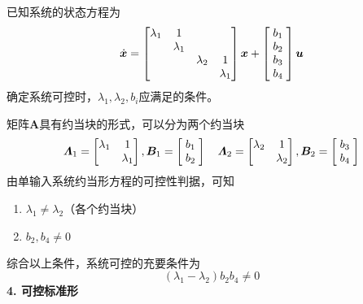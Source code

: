 \examples 已知系统的状态方程为
\begin{equation*}
	\dot{\bm{x}} =
	\begin{bmatrix}
		\lambda_1 & 1 & &\\
		& \lambda_1 & & \\
		& & \lambda_2 & 1 \\
		& &  & \lambda_1 
	\end{bmatrix}
	\bm{x} +
	\begin{bmatrix}
	\hspace*{1mm}	b_1 \hspace*{1mm}\\
		b_2\\
		b_3\\
		b_4
	\end{bmatrix}
	\bm{u}
\end{equation*}
确定系统可控时，$\lambda_1, \lambda_2, b_i$应满足的条件。

\solve 矩阵$\bm{A}$具有约当块的形式，可以分为两个约当块
\begin{equation*}
	\bm{\varLambda}_1 = 
	\begin{bmatrix}
		\lambda_1 & 1\\
		& \lambda_1
	\end{bmatrix},
	\bm{B}_1 = 
	\begin{bmatrix}
		\hspace*{1mm}	b_1 \hspace*{1mm}\\
		b_2\\
	\end{bmatrix}\quad 
	\bm{\varLambda}_2 =
	\begin{bmatrix}
		\lambda_2 & 1\\
		& \lambda_2
	\end{bmatrix},	
	\bm{B}_2 = 
	\begin{bmatrix}
	\hspace*{1mm}	b_3 \hspace*{1mm}\\
	b_4\\
	\end{bmatrix}
\end{equation*}
	由单输入系统约当形方程的可控性判据，可知
	\begin{enumerate}[\hspace*{2em} (1)]
		\item $\lambda_1 \neq \lambda_2$（各个约当块）
		\item $b_2,b_4 \neq 0$
	\end{enumerate}
	综合以上条件，系统可控的充要条件为
	\begin{equation*}
		(\lambda_1 - \lambda_2 )b_2b_4 \neq 0
	\end{equation*}
\newpage
\noindent \textbf{4. 可控标准形}

